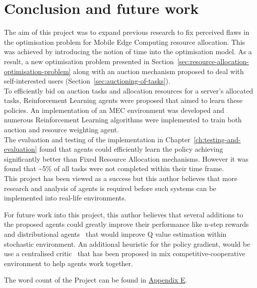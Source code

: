 \chapter{Conclusion and future work}
\label{ch:conclusion-and-future-work}
The aim of this project was to expand previous research to fix perceived flaws in the optimisation problem for
Mobile Edge Computing resource allocation. This was achieved by introducing the notion of time into the optimisation
model. As a result, a new optimisation problem presented in Section~\ref{sec:resource-allocation-optimisation-problem}
along with an auction mechanism proposed to deal with self-interested users (Section~\ref{sec:auctioning-of-tasks}). \\
To efficiently bid on auction tasks and allocation resources for a server's allocated tasks, Reinforcement Learning
agents were proposed that aimed to learn these policies. An implementation of an MEC environment was developed and
numerous Reinforcement Learning algorithms were implemented to train both auction and resource weighting agent. \\
The evaluation and testing of the implementation in Chapter~\ref{ch:testing-and-evaluation} found that agents could
efficiently learn the policy achieving significantly better than Fixed Resource Allocation mechanisms.
However it was found that \sim 5\% of all tasks were not completed within their time frame. \\
This project has been viewed as a success but this author believes that more research and analysis of agents is
required before such systems can be implemented into real-life environments.

For future work into this project, this author believes that several additions to the proposed agents could greatly
improve their performance like n-step rewards~\citep{multi-step-dqn} and distributional
agents~\citep{distributional_dqn} that would improve Q value estimation within stochastic environment. An additional
heuristic for the policy gradient, would be use a centralised critic~\citep{maddpg} that has been proposed in mix
competitive-cooperative environment to help agents work together.

The word count of the Project can be found in \hyperref[app:project-management]{Appendix E}.
